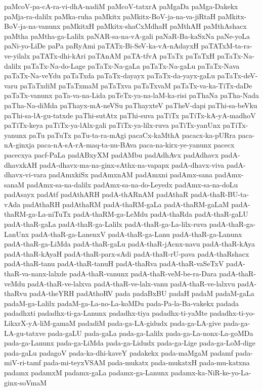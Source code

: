 {paMcoV-pa-cA-ra-vi-dhA-nadiM
paMcoV-tatxrA
paMgaDa
paMga-Dakekx
paMja-ra-dalilx
paMka-ruha
paMkitx
paMkitx-BoV-ja-na-va-jiRtaH
paMkitx-BoV-ja-na-vanunx
paMkitxH
paMkitx-shaCxMdhaH
paMthAH
paMthAshacx
paMtha
paMtha-ga-Lalilx
paNAR-sa-na-vA-gali
paNaR-Ba-kaSxNa
paNe-yoLa
paNi-yo-LiDe
paPa
paRyAmi
paTATx-Bi-SeV-ka-vA-nAdayxH
paTATxM-ta-ra-ve-yilalx
paTATx-dhi-kAri
paTAnAM
paTA-tfvA
paTaTx
paTaTxH
paTaTx-Na-dalilx
paTaTx-Na-do-Lage
paTaTx-Na-gaLa
paTaTx-Na-gaLu
paTaTx-Nava
paTaTx-Na-veYdu
paTaTxda
paTaTx-dayayx
paTaTx-da-yayx-gaLu
paTaTx-deV-varu
paTaTxdiM
paTaTxmaM
paTaTxva
paTaTxvaM
paTaTx-va-ka-TiTx-daDe
paTaTx-vanunx
paTa-va-na-Lida
paTeTx-ya-na-laM-ka-risi
paThaNa
paTha-Nada
paTha-Na-diMda
paThayx-mA-neVSu
paThayxteV
paTheV-dapi
paThi-sa-beVku
paThi-sa-lA-gu-tatxde
paThi-sutAtx
paThi-suva
paTiTx
paTiTx-kA-yA-madhoV
paTiTx-keya
paTiTx-ya-lAlx-gali
paTiTx-ya-lilx-ruva
paTiTx-yanUnx
paTiTx-yanunx
paTu
paTuTx
paTu-ta-ra-mAgi
pacaCx-kaMthA
pacacx-ka-pURra
paca-nA-ginxja
paca-nA-sA-rA-maq-ta-nu-BAva
paca-na-kirx-ye-yanunx
pacecx
pacecxya
pacf-PaLa
padABxyXM
padAMbu
padAdhAvx
padAdhavx
padA-dhavxkAH
padA-dhavx-ma-na-ginx-sAthx-na-vapapx
padA-dhavx-viva
padA-dhavx-vi-vara
padAmxkiSx
padAmxnAM
padAmxni
padAmx-sana
padAmx-sanaM
padAmx-sa-na-dalilx
padAmx-sa-na-do-Leyedx
padAmx-sa-na-doLu
padAsayx
padAtf
padAthARH
padA-thARnAM
padAthaR
padA-thaR-BU-ta-vAda
padAthaRH
padAthaRM
padA-thaRM-gaLa
padA-thaRM-gaLaM
padA-thaRM-ga-La-niTuTx
padA-thaRM-ga-LeMdu
padA-thaRda
padA-thaR-gaLU
padA-thaR-gaLa
padA-thaR-ga-Lalilx
padA-thaR-ga-La-lilx-ruva
padA-thaR-ga-LanUnx
padA-thaR-ga-LanenxV
padA-thaR-ga-Lanu
padA-thaR-ga-Lanunx
padA-thaR-ga-LiMda
padA-thaR-gaLu
padA-thaR-jAcnx-navu
padA-thaR-kAya
padA-thaR-kAyaH
padA-thaR-parx-sAdi
padA-thaR-rU-pava
padA-thaRshacx
padA-thaR-tanu
padA-thaR-tanuH
padA-thaRva
padA-thaR-vaSeTxV
padA-thaR-va-nanx-lalxde
padA-thaR-vanunx
padA-thaR-veM-be-ra-Dara
padA-thaR-veMdu
padA-thaR-ve-lalxva
padA-thaR-ve-lalx-vanu
padA-thaR-ve-lalxvu
padA-thaRvu
padA-theYRH
padAthoRV
pada
padaBxBU
padaH
padaM
padaM-gaLa
padaM-ga-Lalilx
padaM-ga-La-no-La-koMDu
pada-Pa-la-Ba-vakekx
padada
padadhxti
padadhx-ti-ga-Lanunx
padadhx-tiya
padadhx-ti-yaMte
padadhx-ti-yo-LikxrX-yA-liM-gamaM
padadiM
pada-ga-LA-gidudx
pada-ga-LA-give
pada-ga-LA-gu-tatxve
pada-gaLU
pada-gaLa
pada-ga-Lalilx
pada-ga-La-nonx-La-goMDa
pada-ga-Lanunx
pada-ga-LiMda
pada-ga-Lidudx
pada-ga-Lige
pada-ga-LoM-dige
pada-gaLu
padagoV
pada-ka-dhi-kaveY
padakekx
pada-maMgaM
padamf
pada-miV-ri-tamf
pada-mi-teyxVSAM
pada-mukatx
pada-mukatxH
pada-mu-katxna
padamx
padamxM
padamx-gaLa
padamx-ga-Lanunx
padamx-ka-NiR-ke-yo-La-ginx-soVmaM
}
